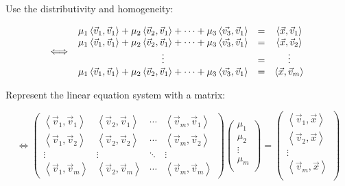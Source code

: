 \documentclass{article}
\newcommand{\lrangle}[1]{\left\langle #1 \right\rangle}
\begin{document}
Use the distributivity and homogeneity:

    \begin{equation}
        \iff
        \begin{array}{c c c}
            \mu _1 \lrangle{ \vec{v}_1, \vec{v}_1 } + \mu _2 \lrangle{
              \vec{v}_2, \vec{v}_1 } + \cdots + \mu _3 \lrangle{ \vec{v_3},
              \vec{v}_1 } &
            = &
            \lrangle{ \vec{x}, \vec{v}_1 } \\
            \mu _1 \lrangle{ \vec{v}_1, \vec{v}_1 } + \mu _2 \lrangle{
              \vec{v}_2, \vec{v}_1 } + \cdots + \mu _3 \lrangle{ \vec{v_3},
              \vec{v}_1 } &
            = &
            \lrangle{ \vec{x}, \vec{v}_2 } \\
            \vdots &
            = &
            \vdots \\
            \mu _1 \lrangle{ \vec{v}_1, \vec{v}_1 } + \mu _2 \lrangle{
              \vec{v}_2, \vec{v}_1 } + \cdots + \mu _3 \lrangle{ \vec{v_3},
              \vec{v}_1 } &
            = &
            \lrangle{ \vec{x}, \vec{v}_m }
        \end{array}
    \end{equation}

Represent the linear equation system with a matrix:

    \begin{equation}
        \iff
        \begin{pmatrix}
            \lrangle{ \vec{v}_1, \vec{v}_1 } &
            \lrangle{ \vec{v}_2, \vec{v}_1 } &
            \cdots &
            \lrangle{ \vec{v}_m, \vec{v}_1 } \\
            \lrangle{ \vec{v}_1, \vec{v}_2 } &
            \lrangle{ \vec{v}_2, \vec{v}_2 } &
            \cdots &
            \lrangle{ \vec{v}_m, \vec{v}_2 } \\
            \vdots & \vdots & \ddots & \vdots \\
            \lrangle{ \vec{v}_1, \vec{v}_m } &
            \lrangle{ \vec{v}_2, \vec{v}_m } &
            \cdots &
            \lrangle{ \vec{v}_m, \vec{v}_m }
        \end{pmatrix}
        \begin{pmatrix}
            \mu _1 \\
            \mu _2 \\
            \vdots \\
            \mu _m \\
        \end{pmatrix}
        =
        \begin{pmatrix}
            \lrangle{ \vec{v}_1, \vec{x} } \\
            \lrangle{ \vec{v}_2, \vec{x} } \\
            \vdots \\
            \lrangle{ \vec{v}_m, \vec{x} } \\
        \end{pmatrix}
    \end{equation}
\end{document}
